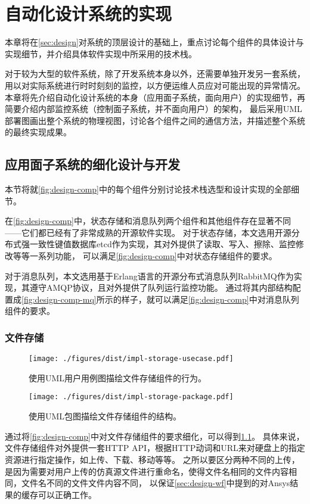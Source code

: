 \documentclass[index]{subfiles}
\begin{document}
\chapter{自动化设计系统的实现}\label{sec:impl}
本章将在\cref{sec:design}对系统的顶层设计的基础上，重点讨论每个组件的具体设计与实现细节，并介绍具体软件实现中所采用的技术栈。

对于较为大型的软件系统，除了开发系统本身以外，还需要单独开发另一套系统，用以对实际系统进行时时刻刻的监控，以方便运维人员应对可能出现的异常情况。
本章将先介绍自动化设计系统的本身（应用面子系统，面向用户）的实现细节，再简要介绍内部监控系统（控制面子系统，并不面向用户）的架构，
最后采用UML部署图画出整个系统的物理视图，讨论各个组件之间的通信方法，并描述整个系统的最终实现成果。

\section{应用面子系统的细化设计与开发}
本节将就\cref{fig:design-comp}中的每个组件分别讨论技术栈选型和设计实现的全部细节。

在\cref{fig:design-comp}中，状态存储和消息队列两个组件和其他组件存在显著不同——它们都已经有了非常成熟的开源软件实现。
对于状态存储，本文选用开源分布式强一致性键值数据库etcd作为实现，其对外提供了读取、写入、擦除、监控修改等等一系列功能，
可以满足\cref{fig:design-comp}中对状态存储组件的要求。

对于消息队列，本文选用基于Erlang语言的开源分布式消息队列RabbitMQ作为实现，其遵守AMQP协议，且对外提供了队列运行监控功能。
通过将其内部结构配置成\cref{fig:design-comp-mq}所示的样子，就可以满足\cref{fig:design-comp}中对消息队列组件的要求。

\subsection{文件存储}
\begin{figure}[h]
  \centering
  \texttt{[image: ./figures/dist/impl-storage-usecase.pdf]}
  \caption[文件存储组件的行为]{使用UML用户用例图描绘文件存储组件的行为。\label{fig:impl-storage-usecase}}
\end{figure}
\begin{figure}[h]
  \centering
  \texttt{[image: ./figures/dist/impl-storage-package.pdf]}
  \caption[文件存储组件的结构]{使用UML包图描绘文件存储组件的结构。\label{fig:impl-storage-package}}
\end{figure}
通过将\cref{fig:design-comp}中对文件存储组件的要求细化，可以得到\cref{fig:impl-storage-usecase}。
具体来说，文件存储组件对外提供一套HTTP API，根据HTTP动词和URL来对硬盘上的指定资源进行指定操作，如上传、下载、移动等等。
之所以要区分两种不同的上传，是因为需要对用户上传的仿真源文件进行重命名，使得文件名相同的文件内容相同，文件名不同的文件文件内容不同，
以保证\cref{sec:design-wf}中提到的对Ansys结果的缓存可以正确工作。
\end{document}
